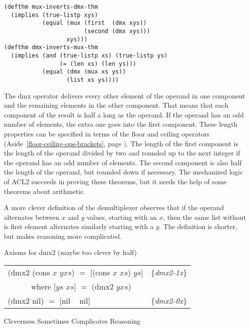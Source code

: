 \label{thm:mux-inverts-dmx}
\label{thm:dmx-inverts-mux}
\begin{Verbatim}
(defthm mux-inverts-dmx-thm
  (implies (true-listp xys)
           (equal (mux (first  (dmx xys))
                       (second (dmx xys)))
                  xys)))
(defthm dmx-inverts-mux-thm
  (implies (and (true-listp xs) (true-listp ys)
                (= (len xs) (len ys)))
           (equal (dmx (mux xs ys))
                  (list xs ys))))
\end{Verbatim}

The dmx operator delivers every other element of the operand in
one component and the remaining elements in the other component.
That means that each component of the result is half a long as the operand.
If the operand has an odd number of elements, the extra one goes into the first component.
These length properties can be specified in terms of the floor and ceiling
operators (Aside~\ref{floor-ceiling-ops-brackets}, page \pageref{floor-ceiling-ops-brackets}).
The length of the first component is the length of the operand divided by two
and rounded up to the next integer if the operand has an odd number of elements.
The second component is also half the length of the operand, but rounded down if necessary.
The mechanized logic of ACL2 succeeds in proving these theorems,
but it needs the help of some theorems about arithmetic.

\begin{aside}
A more clever definition of the demultiplexer
observes that if the operand alternates between $x$ and $y$ values,
starting with an $x$,
then the same list without is first element alternates similarly
starting with a $y$. The definition is shorter,
but makes reasoning more complicated.\\
\begin{center}
Axioms for dmx2 (maybe too clever by half)
\begin{tabular}{ll}
(dmx2 (cons $x$ $yxs$) $=$ [(cons $x$ $xs$) $ys$] & \{\emph{dmx2-1x}\} \\
~~~~~~where [$ys$ $xs$] $=$ (dmx2 $yxs$)          & \\
(dmx2 nil) $=$ [nil ~ nil]                        & \{\emph{dmx2-0x}\} \\
\end{tabular}
\end{center}
\caption{Cleverness Sometimes Complicates Reasoning}
\label{aside:dmx-defun-trick}
\end{aside}

